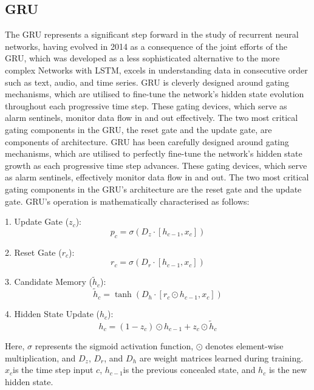 \subsection{GRU}
The GRU represents a significant step forward in the study of recurrent neural networks, having evolved in 2014 as a consequence of the joint efforts of the GRU, which was developed as a less sophisticated alternative to the more complex Networks with LSTM, excels in understanding data in consecutive order such as text, audio, and time series. GRU is cleverly designed around gating mechanisms, which are utilised to fine-tune the network's hidden state evolution throughout each progressive time step. These gating devices, which serve as alarm sentinels, monitor data flow in and out effectively\cite{he2019wind}. The two most critical gating components in the GRU, the reset gate and the update gate, are components of architecture\cite{wu2016investigating,khadka2017evolving}. GRU has been carefully designed around gating mechanisms, which are utilised to perfectly fine-tune the network's hidden state growth as each progressive time step advances. These gating devices, which serve as alarm sentinels, effectively monitor data flow in and out. The two most critical gating components in the GRU's architecture are the reset gate and the update gate\cite{badescu2008modeling}. GRU's operation is mathematically characterised as follows:


1. Update Gate ($z_c$):
\begin{equation}
p_c = \sigma(D_z \cdot [h_{c-1}, x_c])
\end{equation}

2. Reset Gate ($r_c$):
\begin{equation}
r_c = \sigma(D_r \cdot [h_{c-1}, x_c])
\end{equation}

3. Candidate Memory ($\tilde{h}_c$):
\begin{equation}
\tilde{h}_c = \tanh(D_h \cdot [r_c \odot h_{c-1}, x_c])
\end{equation}

4. Hidden State Update ($h_c$):
\begin{equation}
h_c = (1 - z_c) \odot h_{c-1} + z_c \odot \tilde{h}_c
\end{equation}

Here, $\sigma$ represents the sigmoid activation function, $\odot$ denotes element-wise multiplication, and $D_z$, $D_r$, and $D_h$ are weight matrices learned during training. $x_c$is the time step input $c$, $h_{c-1}$is the previous concealed state, and $h_c$ is the new hidden state.





